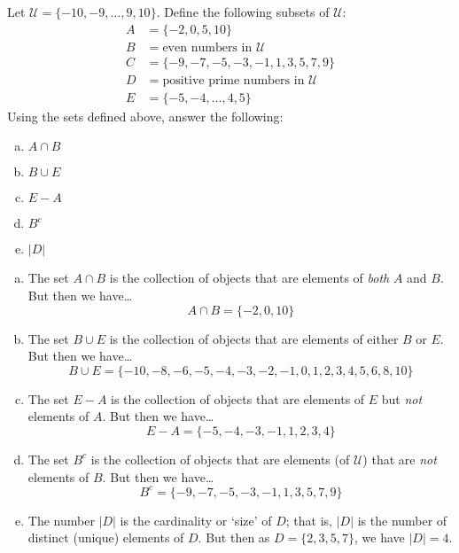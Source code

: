 \documentclass[11pt,letterpaper]{article}
\begin{document}

 Let $\mathcal{U}= \{ -10, -9, \ldots, 9, 10 \}$. Define the following subsets of $\mathcal{U}$:
	\[
	\begin{aligned}
	A&= \{ -2, 0, 5, 10 \} \\
	B&= \text{even numbers in } \mathcal{U} \\
	C&= \{ -9, -7, -5, -3, -1, 1, 3, 5, 7, 9 \} \\
	D&= \text{positive prime numbers in } \mathcal{U} \\
	E&= \{ -5, -4, \ldots, 4, 5 \} 
	\end{aligned}
	\]
Using the sets defined above, answer the following: 
        \begin{enumerate}[(a)]
        \item $A \cap B$
        \item $B \cup E$
        \item $E - A$
        \item $B^c$
        \item $|D|$
        \end{enumerate} \pspace

\sol 
\begin{enumerate}[(a)]
\item The set $A \cap B$ is the collection of objects that are elements of \textit{both} $A$ and $B$. But then we have\dots
	\[
	A \cap B= \{ -2, 0, 10 \}
	\] \pspace

\item The set $B \cup E$ is the collection of objects that are elements of either $B$ or $E$. But then we have\dots
	\[
	B \cup E= \{ -10, -8, -6, -5, -4, -3, -2, -1, 0, 1, 2, 3, 4, 5, 6, 8, 10 \}
	\] \pspace

\item The set $E - A$ is the collection of objects that are elements of $E$ but \textit{not} elements of $A$. But then we have\dots
	\[
	E - A= \{ -5, -4, -3, -1, 1, 2, 3, 4 \}
	\] \pspace

\item The set $B^c$ is the collection of objects that are elements (of $\mathcal{U}$) that are \textit{not} elements of $B$. But then we have\dots
	\[
	B^c= \{ -9, -7, -5, -3, -1, 1, 3, 5, 7, 9 \}
	\] \pspace

\item The number $|D|$ is the cardinality or `size' of $D$; that is, $|D|$ is the number of distinct (unique) elements of $D$. But then as $D= \{ 2, 3, 5, 7 \}$, we have $|D|= 4$. 
\end{enumerate}
\end{document}
